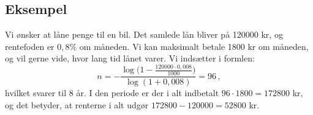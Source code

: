 \documentclass[12pt,oneside,a4paper]{article}
\begin{document}
\begin{tcolorbox}
\subsection*{Eksempel}
Vi ønsker at låne penge til en bil. Det samlede lån bliver på 120000 kr, og
rentefoden er $0,8\%$ om måneden. Vi kan maksimalt betale 1800 kr om
måneden, og vil gerne vide, hvor lang tid lånet varer.  Vi indsætter i
formlen:
\[
n = -\frac{\log\big(1-\frac{120000\cdot0,008}{1000}\big)}{\log(1+0,008)} = 96 \,,
\]
hvilket svarer til 8 år.
I den periode er der i alt indbetalt $96\cdot 1800 = 172800$ kr, og det betyder,
at renterne i alt udgør $172800-120000 = 52800$ kr.
\end{tcolorbox}
\end{document}
